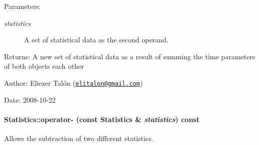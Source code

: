 \begin{Desc}
\item[Parameters:]
\begin{description}
\item[{\em statistics}]A set of statistical data as the second operand.\end{description}
\end{Desc}
\begin{Desc}
\item[Returns:]A new set of statistical data as a result of summing the time parameters of both objects each other\end{Desc}
\begin{Desc}
\item[Author:]Eliezer Talón (\href{mailto:elitalon@gmail.com}{\tt elitalon@gmail.com}) \end{Desc}
\begin{Desc}
\item[Date:]2008-10-22 \end{Desc}
\hypertarget{class_statistics_529bed34d909d88440214d6983779043}{
\paragraph[{operator-}]{ Statistics::operator- (const {\bf Statistics} \& {\em statistics}) const}\hfill}
\label{class_statistics_529bed34d909d88440214d6983779043}


Allows the subtraction of two different statistics. 

